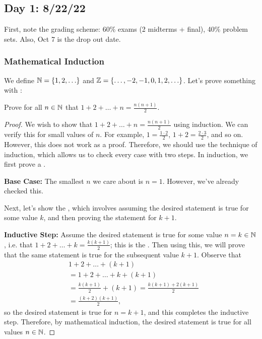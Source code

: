 \documentclass[main.tex]{subfiles}
\begin{document}
\subsection{Day 1: 8/22/22}
First, note the grading scheme: 60\% exams (2 midterms + final), 40\% problem sets. Also, Oct 7 is the drop out date.

\subsubsection{Mathematical Induction}
We define $\mathbb N = \{1, 2, \ldots \}$ and $\mathbb Z = \{\ldots , -2, -1, 0, 1, 2, \ldots \}$. Let's prove something with :

\begin{example}
    Prove for all $n\in \mathbb N$ that $1 + 2 + \ldots + n = \frac{n(n + 1)}{2}$.
\end{example}

\begin{proof}
    We wish to show that $1 + 2 + \ldots + n = \frac{n(n + 1)}{2}$ using induction. We can verify this for small values of $n$. For example, $1 = \frac{1 \cdot 2}{2}$, $1 + 2 = \frac{2\cdot 3}{2}$, and so on. However, this does not work as a proof. Therefore, we should use the technique of induction, which allows us to check every case with two steps. In induction, we first prove a .

    \textbf{Base Case:} The smallest $n$ we care about is $n = 1$. However, we've already checked this.

    Next, let's show the , which involves assuming the desired statement is true for some value $k$, and then proving the statement for $k + 1$.

    \textbf{Inductive Step:} Assume the desired statement is true for some value $n = k\in \mathbb N$, i.e. that $1 + 2 + \ldots + k = \frac{k(k + 1)}{2}$; this is the . Then using this, we will prove that the same statement is true for the subsequent value $k + 1$. Observe that
    \begin{align*}
        &1 + 2 + \ldots + (k + 1) \\
        &= 1 + 2 + \ldots + k + (k + 1) \\
        &= \frac{k(k + 1)}{2} + (k + 1) = \frac{k(k + 1) + 2(k + 1)}{2} \\
        &= \frac{(k + 2)(k + 1)}{2},
    \end{align*}
    so the desired statement is true for $n = k + 1$, and this completes the inductive step. Therefore, by mathematical induction, the desired statement is true for all values $n\in \mathbb N$.
\end{proof}
\end{document}
